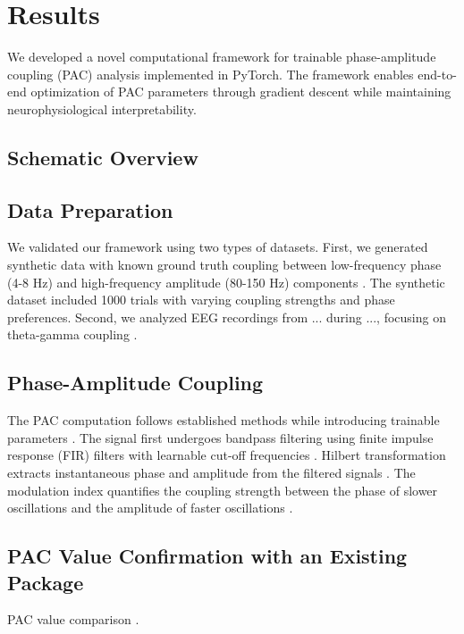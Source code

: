 
\section{Results}

We developed a novel computational framework for trainable phase-amplitude coupling (PAC) analysis implemented in PyTorch. The framework enables end-to-end optimization of PAC parameters through gradient descent while maintaining neurophysiological interpretability.

\subsection{Schematic Overview}
\subsection{Data Preparation}
We validated our framework using two types of datasets. First, we generated synthetic data with known ground truth coupling between low-frequency phase (4-8 Hz) and high-frequency amplitude (80-150 Hz) components . The synthetic dataset included 1000 trials with varying coupling strengths and phase preferences. Second, we analyzed EEG recordings from ... during ..., focusing on theta-gamma coupling .

\subsection{Phase-Amplitude Coupling}
The PAC computation follows established methods while introducing trainable parameters . The signal first undergoes bandpass filtering using finite impulse response (FIR) filters with learnable cut-off frequencies . Hilbert transformation extracts instantaneous phase and amplitude from the filtered signals . The modulation index quantifies the coupling strength between the phase of slower oscillations and the amplitude of faster oscillations .

\subsection{PAC Value Confirmation with an Existing Package}
PAC value comparison .

